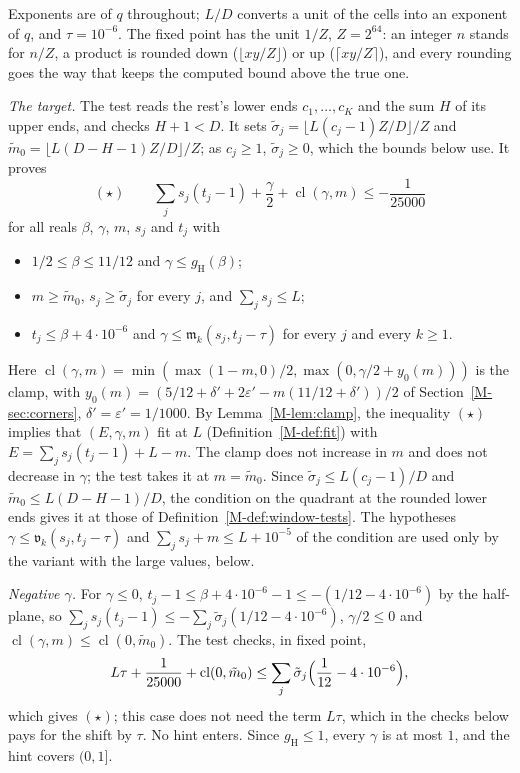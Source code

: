 \documentclass[11pt]{article}
\numberwithin{equation}{section}
\begin{document}
Exponents are of $q$ throughout; $L/D$ converts a unit of the cells into an exponent of $q$, and $\tau = 10^{-6}$. The
fixed point has the unit $1/Z$, $Z = 2^{64}$: an integer $n$ stands for $n/Z$, a product is
rounded down ($\lfloor xy/Z \rfloor$) or up ($\lceil xy/Z \rceil$), and every rounding goes the way that keeps the
computed bound above the true one.

\emph{The target.} The test reads the rest's lower ends $c_1, \dots, c_K$ and the sum $H$ of its upper ends, and checks
$H + 1 < D$. It sets $\tilde\sigma_j = \lfloor L(c_j - 1) Z/D \rfloor/Z$ and $\tilde m_0 = \lfloor L(D - H - 1)
Z/D \rfloor/Z$; as $c_j \ge 1$, $\tilde\sigma_j \ge 0$, which the bounds below use. It proves
\[
  (\star) \qquad \sum_j s_j(t_j - 1) + \frac\gamma2 + \operatorname{cl}(\gamma, m) \le -\frac1{25000}
\]
for all reals $\beta$, $\gamma$, $m$, $s_j$ and $t_j$ with
\begin{itemize}
\item $1/2 \le \beta \le 11/12$ and $\gamma \le g_{\mathrm H}(\beta)$;
\item $m \ge \tilde m_0$, $s_j \ge \tilde\sigma_j$ for every $j$, and $\sum_j s_j \le L$;
\item $t_j \le \beta + 4 \cdot 10^{-6}$ and $\gamma \le \mathfrak m_k(s_j, t_j - \tau)$ for every $j$ and every $k \ge
  1$.
\end{itemize}
Here $\operatorname{cl}(\gamma, m) = \min(\max(1 - m, 0)/2, \max(0, \gamma/2 + y_0(m)))$ is the clamp, with $y_0(m) =
(5/12 + \delta' + 2\varepsilon' - m(11/12 + \delta'))/2$ of Section~\ref{M-sec:corners}, $\delta' = \varepsilon' =
1/1000$.
By Lemma~\ref{M-lem:clamp}, the
inequality $(\star)$ implies that $(E, \gamma, m)$ fit at $L$ (Definition~\ref{M-def:fit}) with $E = \sum_j s_j(t_j -
1) + L - m$.
The clamp does not increase in $m$ and does not decrease in $\gamma$; the test takes it at $m = \tilde m_0$. Since
$\tilde\sigma_j \le L(c_j - 1)/D$ and $\tilde m_0 \le L(D - H - 1)/D$, the condition on the quadrant at the rounded
lower ends gives it at those of Definition~\ref{M-def:window-tests}. The hypotheses $\gamma \le \mathfrak v_k(s_j, t_j -
\tau)$ and $\sum_j s_j + m \le L + 10^{-5}$ of the condition are used only by the variant with the large values, below.

\emph{Negative $\gamma$.} For $\gamma \le 0$, $t_j - 1 \le \beta + 4 \cdot 10^{-6} - 1 \le -(1/12 - 4 \cdot 10^{-6})$ by
the half-plane, so $\sum_j s_j(t_j - 1) \le -\sum_j \tilde\sigma_j(1/12 - 4 \cdot 10^{-6})$, $\gamma/2 \le 0$ and
$\operatorname{cl}(\gamma, m) \le \operatorname{cl}(0, \tilde m_0)$. The test checks, in fixed point,
\[
  L\tau + \frac1{25000} + \operatorname{cl}(0, \tilde m_0) \le \sum_j \tilde\sigma_j \Bigl(\frac1{12} - 4 \cdot
  10^{-6}\Bigr),
\]
which gives $(\star)$; this case does not need the term $L\tau$, which in the checks below pays for the shift by
$\tau$.
No hint enters. Since $g_{\mathrm H} \le 1$, every
$\gamma$ is at most $1$, and the hint covers $(0, 1]$.
\end{document}
